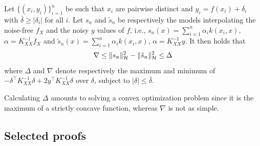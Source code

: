 \begin{proposition}
	Let $\{(x_i,y_i)\}_{i=1}^n$ be such that $x_i$ are pairwise distinct and $y_i = f(x_i) + \delta_i$ with $\bar \delta \geq |\delta_i|$ for all $i$. Let $s_n$ and $\tilde s_n$ be respectively the models interpolating the noise-free $f_X$ and the noisy $y$ values of $f$, i.e., $s_n(x) = \sum_{i=1}^n \alpha_i k(x_i,x)$, $\alpha = K_{XX}^{-1} f_X$ and $\tilde s_n(x) = \sum_{i=1}^n \alpha_i k(x_i,x)$, $\alpha = K_{XX}^{-1} y$. It then holds that
	\begin{equation}
		\nabla \leq \Vert s_n \Vert_{\mathcal{H}}^2 - \Vert \tilde s_n \Vert_{\mathcal{H}}^2 \leq \Delta
	\end{equation}
	where $\Delta$ and $\nabla$ denote respectively the maximum and minimum of $-\delta^\top K_{XX}^{-1} \delta + 2y^\top K_{XX}^{-1} \delta$ over $\delta$, subject to $|\delta| \leq \bar \delta$.
	\label{prop.norms_mismatch}
\end{proposition}

Calculating $\Delta$ amounts to solving a convex optimization problem since it is the maximum of a strictly concave function, whereas $\nabla$ is not as simple.

\subsection{Selected proofs}
\label{sec.selected_derivations}

